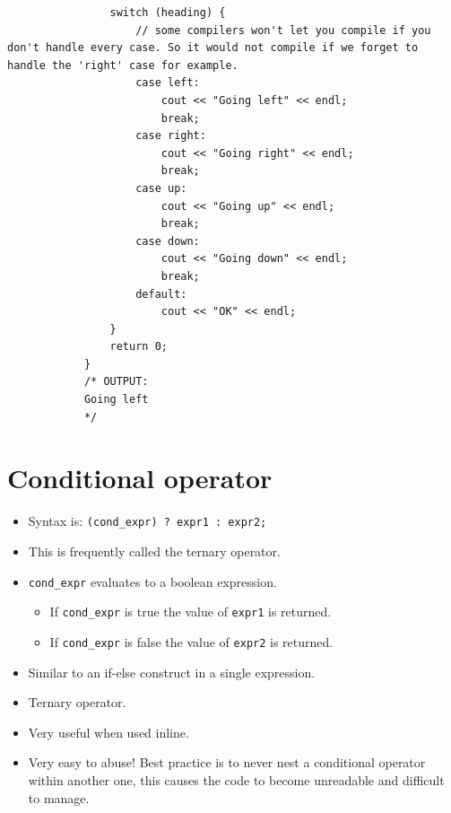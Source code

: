 \begin{itemize}
\begin{verbatim}
                switch (heading) {
                    // some compilers won't let you compile if you don't handle every case. So it would not compile if we forget to  handle the 'right' case for example.
                    case left:
                        cout << "Going left" << endl;
                        break;
                    case right:
                        cout << "Going right" << endl;
                        break;
                    case up:
                        cout << "Going up" << endl;
                        break;
                    case down:
                        cout << "Going down" << endl;
                        break;
                    default: 
                        cout << "OK" << endl;
                }
                return 0;
            }
            /* OUTPUT:
            Going left
            */
        \end{verbatim}
\end{itemize}


\section{Conditional operator}
\begin{itemize}
    \item Syntax is: \verb|(cond_expr) ? expr1 : expr2;|
    \item This is frequently called the ternary operator.
    \item \verb|cond_expr| evaluates to a boolean expression.
        \begin{itemize}
            \item If \verb|cond_expr| is true the value of \verb|expr1| is returned.
            \item If \verb|cond_expr| is false the value of \verb|expr2| is returned.
        \end{itemize}
    \item Similar to an if-else construct in a single expression.
    \item Ternary operator.
    \item Very useful when used inline.
    \item Very easy to abuse! Best practice is to never nest a conditional operator within another one, this causes the code to become unreadable and difficult to manage.
\end{itemize}


